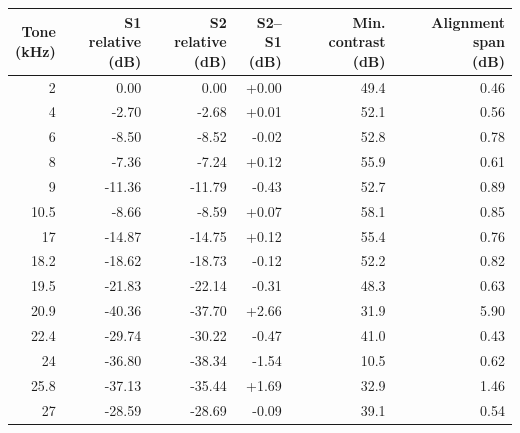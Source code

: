 \begin{tabular}{@{}rrrrrr@{}}
\toprule
\shortstack{Tone\\(kHz)} & \shortstack{S1 relative\\(dB)} & \shortstack{S2 relative\\(dB)} & \shortstack{S2--S1\\(dB)} & \shortstack{Min. contrast\\(dB)} & \shortstack{Alignment span\\(dB)} \\
\midrule
2 & 0.00 & 0.00 & +0.00 & 49.4 & 0.46 \\
4 & -2.70 & -2.68 & +0.01 & 52.1 & 0.56 \\
6 & -8.50 & -8.52 & -0.02 & 52.8 & 0.78 \\
8 & -7.36 & -7.24 & +0.12 & 55.9 & 0.61 \\
9 & -11.36 & -11.79 & -0.43 & 52.7 & 0.89 \\
10.5 & -8.66 & -8.59 & +0.07 & 58.1 & 0.85 \\
17 & -14.87 & -14.75 & +0.12 & 55.4 & 0.76 \\
18.2 & -18.62 & -18.73 & -0.12 & 52.2 & 0.82 \\
19.5 & -21.83 & -22.14 & -0.31 & 48.3 & 0.63 \\
20.9 & -40.36 & -37.70 & +2.66 & 31.9 & 5.90 \\
22.4 & -29.74 & -30.22 & -0.47 & 41.0 & 0.43 \\
24 & -36.80 & -38.34 & -1.54 & 10.5 & 0.62 \\
25.8 & -37.13 & -35.44 & +1.69 & 32.9 & 1.46 \\
27 & -28.59 & -28.69 & -0.09 & 39.1 & 0.54 \\
\bottomrule
\end{tabular}
